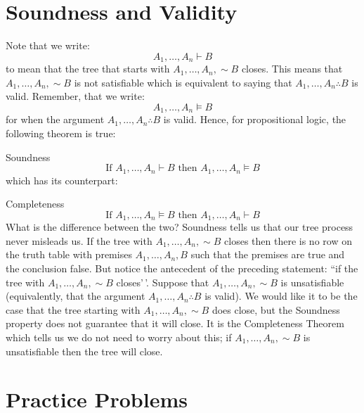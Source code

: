 \documentclass[
]{book}
\begin{document}
\hypertarget{soundness-and-validity}{%
\section{Soundness and Validity}\label{soundness-and-validity}}

Note that we write:
\[
A_1,\ldots,A_n \vdash B
\]
to mean that the tree that starts with \(A_1,\ldots,A_n, \sim B\) closes. This means that \(A_1,\ldots,A_n, \sim B\) is not satisfiable which is equivalent to saying that \(A_1,\ldots,A_n \therefore B\) is valid. Remember, that we write:
\[
A_1,\ldots,A_n \vDash B
\]
for when the argument \(A_1,\ldots,A_n \therefore B\) is valid. Hence, for propositional logic, the following theorem is true:

Soundness
\[
        \text{If } A_1,\ldots, A_n \vdash B \text{ then } A_1,\ldots, A_n \vDash B
\]
which has its counterpart:

Completeness
\[
        \text{If } A_1,\ldots, A_n \vDash B \text{ then } A_1,\ldots, A_n \vdash B
\]
What is the difference between the two? Soundness tells us that our tree process never misleads us. If the tree with \(A_1,\ldots,A_n, \sim B\) closes then there is no row on the truth table with premises \(A_1,\ldots,A_n, B\) such that the premises are true and the conclusion false. But notice the antecedent of the preceding statement: ``if the tree with \(A_1,\ldots,A_n,\sim B\) closes'\,'. Suppose that \(A_1,\ldots,A_n, \sim B\) is unsatisfiable (equivalently, that the argument \(A_1,\ldots,A_n \therefore B\) is valid). We would like it to be the case that the tree starting with \(A_1,\ldots,A_n,\sim B\) does close, but the Soundness property does not guarantee that it will close. It is the Completeness Theorem which tells us we do not need to worry about this; if \(A_1,\ldots,A_n, \sim B\) is unsatisfiable then the tree will close.

\hypertarget{practice-problems-2}{%
\section{Practice Problems}\label{practice-problems-2}}
\end{document}
